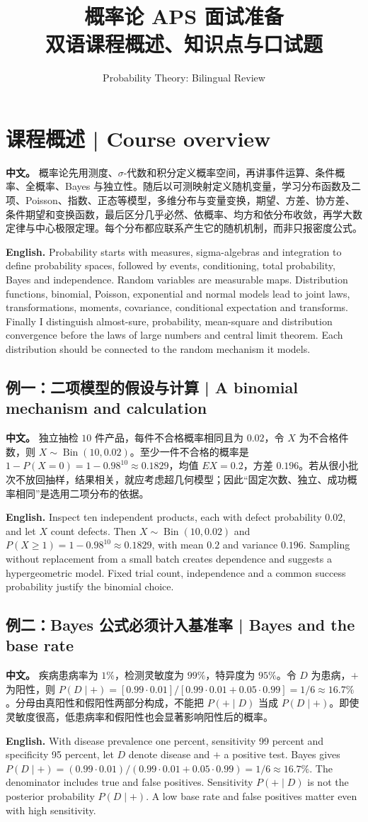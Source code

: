 \documentclass[UTF8,11pt,a4paper]{ctexart}
\title{概率论 APS 面试准备\\[4pt]\large 双语课程概述、知识点与口试题}
\author{Probability Theory: Bilingual Review}
\date{}
\newcommand{\APS}[2]{\par\noindent\textbf{中文。} #1\par\noindent\textbf{English.} #2\par\smallskip}
\begin{document}
\maketitle
\section*{课程概述 | Course overview}
\APS{概率论先用测度、$\sigma$-代数和积分定义概率空间，再讲事件运算、条件概率、全概率、Bayes 与独立性。随后以可测映射定义随机变量，学习分布函数及二项、Poisson、指数、正态等模型，多维分布与变量变换，期望、方差、协方差、条件期望和变换函数，最后区分几乎必然、依概率、均方和依分布收敛，再学大数定律与中心极限定理。每个分布都应联系产生它的随机机制，而非只报密度公式。}{Probability starts with measures, sigma-algebras and integration to define probability spaces, followed by events, conditioning, total probability, Bayes and independence. Random variables are measurable maps. Distribution functions, binomial, Poisson, exponential and normal models lead to joint laws, transformations, moments, covariance, conditional expectation and transforms. Finally I distinguish almost-sure, probability, mean-square and distribution convergence before the laws of large numbers and central limit theorem. Each distribution should be connected to the random mechanism it models.}
\subsection*{例一：二项模型的假设与计算 | A binomial mechanism and calculation}
\APS{独立抽检 $10$ 件产品，每件不合格概率相同且为 $0.02$，令 $X$ 为不合格件数，则 $X\sim\operatorname{Bin}(10,0.02)$。至少一件不合格的概率是 $1-P(X=0)=1-0.98^{10}\approx0.1829$，均值 $EX=0.2$，方差 $0.196$。若从很小批次不放回抽样，结果相关，就应考虑超几何模型；因此“固定次数、独立、成功概率相同”是选用二项分布的依据。}{Inspect ten independent products, each with defect probability $0.02$, and let $X$ count defects. Then $X\sim\operatorname{Bin}(10,0.02)$ and $P(X\ge1)=1-0.98^{10}\approx0.1829$, with mean $0.2$ and variance $0.196$. Sampling without replacement from a small batch creates dependence and suggests a hypergeometric model. Fixed trial count, independence and a common success probability justify the binomial choice.}
\subsection*{例二：Bayes 公式必须计入基准率 | Bayes and the base rate}
\APS{疾病患病率为 $1\%$，检测灵敏度为 $99\%$，特异度为 $95\%$。令 $D$ 为患病，$+$ 为阳性，则 $P(D\mid+)=[0.99\cdot0.01]/[0.99\cdot0.01+0.05\cdot0.99]=1/6\approx16.7\%$。分母由真阳性和假阳性两部分构成，不能把 $P(+\mid D)$ 当成 $P(D\mid+)$。即使灵敏度很高，低患病率和假阳性也会显著影响阳性后的概率。}{With disease prevalence one percent, sensitivity 99 percent and specificity 95 percent, let $D$ denote disease and $+$ a positive test. Bayes gives $P(D\mid+)=(0.99\cdot0.01)/(0.99\cdot0.01+0.05\cdot0.99)=1/6\approx16.7\%$. The denominator includes true and false positives. Sensitivity $P(+\mid D)$ is not the posterior probability $P(D\mid+)$. A low base rate and false positives matter even with high sensitivity.}
\end{document}
